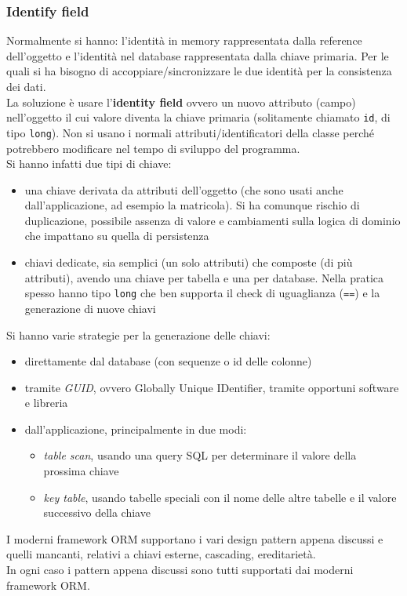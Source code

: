 \subsubsection{Identify field}
Normalmente si hanno: l'identità in memory rappresentata dalla reference dell'oggetto e l'identità nel database rappresentata dalla chiave primaria. Per le quali si ha bisogno di accoppiare/sincronizzare le due identità per la consistenza dei dati.\\ 
La soluzione è usare l'\textbf{identity field} ovvero un nuovo attributo (campo) nell'oggetto il cui valore diventa la chiave primaria (solitamente chiamato \texttt{id}, di tipo \texttt{long}). Non si usano i normali attributi/identificatori della classe perché potrebbero modificare nel tempo di sviluppo del programma.\\
Si hanno infatti due tipi di chiave:
\begin{itemize}
  \item una chiave derivata da attributi dell'oggetto (che sono usati anche dall'applicazione, ad esempio la matricola). Si ha comunque rischio di duplicazione, possibile assenza di valore e cambiamenti sulla logica di dominio che impattano su quella di persistenza
  \item chiavi dedicate, sia semplici (un solo attributi) che composte (di più attributi), avendo una chiave per tabella e una per database. Nella pratica spesso hanno tipo \texttt{long} che ben supporta il check di uguaglianza (\texttt{==}) e la generazione di nuove chiavi
\end{itemize}
Si hanno varie strategie per la generazione delle chiavi:
\begin{itemize}
  \item direttamente dal database (con sequenze o id delle colonne)
  \item tramite \textit{GUID}, ovvero Globally Unique IDentifier, tramite opportuni software e libreria
  \item dall'applicazione, principalmente in due modi:
  \begin{itemize}
    \item \textit{table scan}, usando una query SQL per determinare il valore della prossima chiave
    \item \textit{key table}, usando tabelle speciali con il nome delle altre tabelle e il valore successivo della chiave
  \end{itemize}
\end{itemize}
I moderni framework ORM supportano i vari design pattern appena discussi e quelli mancanti, relativi a chiavi esterne, cascading, ereditarietà. \\ In ogni caso i pattern appena discussi sono tutti supportati dai moderni framework ORM.

